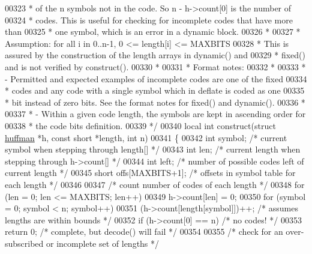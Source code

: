 \begin{DoxyCode}
00323 \textcolor{comment}{ * of the n symbols not in the code.  So n - h->count[0] is the number of}
00324 \textcolor{comment}{ * codes.  This is useful for checking for incomplete codes that have more than}
00325 \textcolor{comment}{ * one symbol, which is an error in a dynamic block.}
00326 \textcolor{comment}{ *}
00327 \textcolor{comment}{ * Assumption: for all i in 0..n-1, 0 <= length[i] <= MAXBITS}
00328 \textcolor{comment}{ * This is assured by the construction of the length arrays in dynamic() and}
00329 \textcolor{comment}{ * fixed() and is not verified by construct().}
00330 \textcolor{comment}{ *}
00331 \textcolor{comment}{ * Format notes:}
00332 \textcolor{comment}{ *}
00333 \textcolor{comment}{ * - Permitted and expected examples of incomplete codes are one of the fixed}
00334 \textcolor{comment}{ *   codes and any code with a single symbol which in deflate is coded as one}
00335 \textcolor{comment}{ *   bit instead of zero bits.  See the format notes for fixed() and dynamic().}
00336 \textcolor{comment}{ *}
00337 \textcolor{comment}{ * - Within a given code length, the symbols are kept in ascending order for}
00338 \textcolor{comment}{ *   the code bits definition.}
00339 \textcolor{comment}{ */}
00340 local \textcolor{keywordtype}{int} construct(\textcolor{keyword}{struct} \hyperlink{structhuffman}{huffman} *h, \textcolor{keyword}{const} \textcolor{keywordtype}{short} *length, \textcolor{keywordtype}{int} n)
00341 \{
00342     \textcolor{keywordtype}{int} symbol;         \textcolor{comment}{/* current symbol when stepping through length[] */}
00343     \textcolor{keywordtype}{int} len;            \textcolor{comment}{/* current length when stepping through h->count[] */}
00344     \textcolor{keywordtype}{int} left;           \textcolor{comment}{/* number of possible codes left of current length */}
00345     \textcolor{keywordtype}{short} offs[MAXBITS+1];      \textcolor{comment}{/* offsets in symbol table for each length */}
00346 
00347     \textcolor{comment}{/* count number of codes of each length */}
00348     \textcolor{keywordflow}{for} (len = 0; len <= MAXBITS; len++)
00349         h->count[len] = 0;
00350     for (symbol = 0; symbol < n; symbol++)
00351         (h->count[length[symbol]])++;   \textcolor{comment}{/* assumes lengths are within bounds */}
00352     \textcolor{keywordflow}{if} (h->count[0] == n)               \textcolor{comment}{/* no codes! */}
00353         \textcolor{keywordflow}{return} 0;                       \textcolor{comment}{/* complete, but decode() will fail */}
00354 
00355     \textcolor{comment}{/* check for an over-subscribed or incomplete set of lengths */}

\end{DoxyCode}
